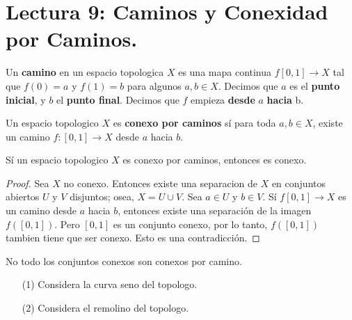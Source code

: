 \section*{Lectura 9: Caminos y Conexidad por Caminos.}

\begin{definition}
    Un \textbf{camino} en un espacio topologica $X$ es una mapa continua
    $f[0,1] \xrightarrow{} X$ tal que $f(0)=a$ y $f(1)=b$ para algunos $a,b \in
    X$. Decimos que  $a$ es el  \textbf{punto inicial}, y $b$ el  \textbf{punto
    final}. Decimos que $f$ empieza  \textbf{desde} $a$  \textbf{hacia} b.
\end{definition}

\begin{definition}
    Un espacio topologico $X$ es  \textbf{conexo por caminos} s\'i para toda
    $a,b \in X$, existe un camino  $f:[0,1] \xrightarrow{} X$ desde $a$ hacia
    $b$.
\end{definition}

\begin{theorem}\label{9.18}
    S\'i un espacio topologico $X$ es conexo por caminos, entonces es conexo.
\end{theorem}
\begin{proof}
    Sea $X$ no conexo. Entonces existe una separacion de  $X$ en conjuntos
    abiertos $U$ y  $V$ disjuntos; osea, $X=U \cup V$. Sea $a \in U$ y $b \in
    V$. S\'i $f [0,1] \xrightarrow{} X$ es un camino desde $a$ hacia $b$,
    entonces existe una separaci\'on de la imagen $f([0,1])$. Pero $[0,1]$ es un
    conjunto conexo, por lo tanto, $f([0,1])$ tambien tiene que ser conexo. Esto
    es una contradicci\'on.
\end{proof}

\begin{example}\label{}
    No todo los conjuntos conexos son conexos por camino.
    \begin{enumerate}
        \item[(1)] Considera la curva seno del topologo.

        \item[(2)] Considera el remolino del topologo.
    \end{enumerate}
\end{example}

